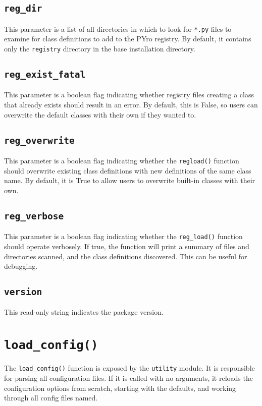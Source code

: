 \subsection{\texttt{reg\_dir}}
This parameter is a list of all directories in which to look for \verb|*.py| files to examine for class definitions to add to the PYro registry.  By default, it contains only the \verb|registry| directory in the base installation directory.

\subsection{\texttt{reg\_exist\_fatal}}
This parameter is a boolean flag indicating whether registry files creating a class that already exists should result in an error.  By default, this is False, so users can overwrite the default classes with their own if they wanted to.

\subsection{\texttt{reg\_overwrite}}
This parameter is a boolean flag indicating whether the \verb|regload()| function should overwrite existing class definitions with new definitions of the same class name.  By default, it is True to allow users to overwrite built-in classes with their own.

\subsection{\texttt{reg\_verbose}}
This parameter is a boolean flag indicating whether the \verb|reg_load()| function should operate verbosely.  If true, the function will print a summary of files and directories scanned, and the class definitions discovered.  This can be useful for debugging.

\subsection{\texttt{version}}
This read-only string indicates the package version.

\section{\texttt{load\_config()}}\label{sec:loadconfig}
The \verb|load_config()| function is exposed by the \verb|utility| module.  It is responsible for parsing all configuration files.  If it is called with no arguments, it reloads the configuration options from scratch, starting with the defaults, and working through all config files named.

